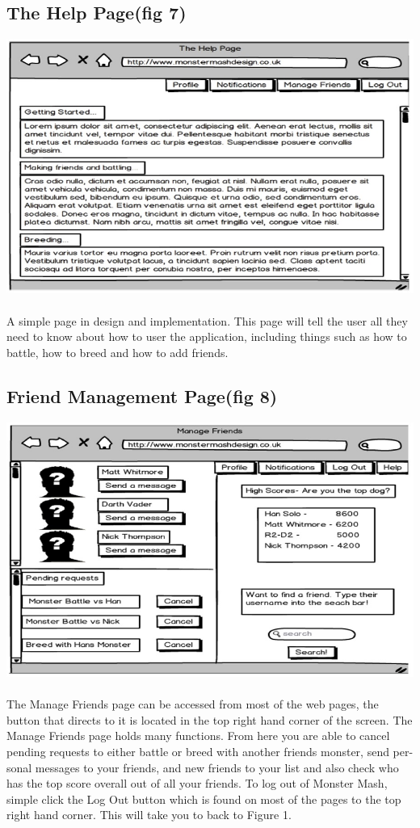 \documentclass{project}
\begin{document}
\subsection{The Help Page(fig 7)}
\includegraphics[scale=0.5]{help.jpg}
\\
\\
A simple page in design and implementation. This page will tell the user all they
need to know about how to user the application, including things such as how to
battle, how to breed and how to add friends.

\subsection{Friend Management Page(fig 8)}
\includegraphics[scale=0.5]{manageFriends.jpg}
\\
\\
The Manage Friends page can be accessed from most of the web pages, the button
that directs to it is located in the top right hand corner of the screen.
The Manage Friends page holds many functions. From here you are able to cancel
pending requests to either battle or breed with another friends monster, send per-
sonal messages to your friends, and new friends to your list and also check who has
the top score overall out of all your friends.
To log out of Monster Mash, simple click the Log Out button which is found on
most of the pages to the top right hand corner. This will take you to back to Figure
1.
\end{document}
